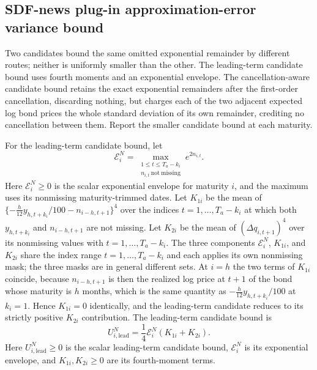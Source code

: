 \documentclass[11pt]{article}
\begin{document}
\subsection{SDF-news plug-in approximation-error variance bound}

Two candidates bound the same omitted exponential remainder by different routes; neither is
uniformly smaller than the other. The leading-term candidate bound uses fourth moments and an
exponential envelope. The cancellation-aware candidate bound retains the exact exponential remainders
after the first-order cancellation, discarding nothing, but charges each of the two adjacent expected
log bond prices the whole standard deviation of its own remainder, crediting no cancellation between
them. Report the smaller candidate bound at each maturity.

For the leading-term candidate bound, let
\begin{equation*}
 \mathcal E_i^N=\max_{\substack{1\le t\le T_a-k_i\\ n_{i,t}\ \mathrm{not\ missing}}} e^{2n_{i,t}}.
\end{equation*}
Here \(\mathcal E_i^N\ge0\) is the scalar exponential envelope for maturity \(i\), and the maximum
uses its nonmissing maturity-trimmed dates. Let \(K_{1i}\) be the mean of
\(\{-\tfrac{h}{12}y_{h,t+k_i}/100-n_{i-h,t+1}\}^4\) over the indices \(t=1,\ldots,T_a-k_i\) at which
both \(y_{h,t+k_i}\) and \(n_{i-h,t+1}\) are not missing. Let \(K_{2i}\) be the
mean of \((\Delta q_{i,t+1})^4\) over its nonmissing values with
\(t=1,\ldots,T_a-k_i\). The three components \(\mathcal E_i^N\), \(K_{1i}\), and \(K_{2i}\) share the
index range \(t=1,\ldots,T_a-k_i\) and each applies its own nonmissing mask; the three masks are in
general different sets. At \(i=h\) the two terms of \(K_{1i}\) coincide, because \(n_{i-h,t+1}\) is
then the realized log price at \(t+1\) of the bond whose maturity is \(h\) months, which is the same
quantity as \(-\tfrac{h}{12}y_{h,t+k_i}/100\) at \(k_i=1\). Hence \(K_{1i}=0\) identically, and the
leading-term candidate reduces to its strictly positive \(K_{2i}\) contribution. The
leading-term candidate bound is
\begin{equation*}
 U_{i,\mathrm{lead}}^N=\frac14\mathcal E_i^N(K_{1i}+K_{2i}).
\end{equation*}
Here \(U_{i,\mathrm{lead}}^N\ge0\) is the scalar leading-term candidate bound,
\(\mathcal E_i^N\) is its exponential envelope, and \(K_{1i},K_{2i}\ge0\) are its fourth-moment
terms.
\end{document}
